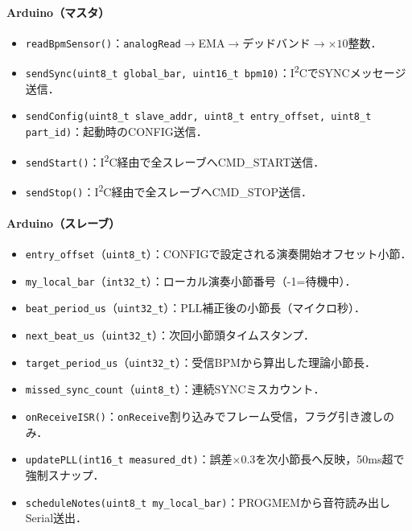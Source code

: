 \documentclass[lualatex,book,paper=a4paper,jafontsize=11.5pt,jafontscale=1.05]{jlreq}
\begin{document}
\paragraph{Arduino（マスタ）}
\begin{itemize}[leftmargin=1.2em]
  \item \texttt{readBpmSensor()}：\texttt{analogRead}$\to$EMA$\to$デッドバンド$\to \times 10$整数．
  \item \texttt{sendSync(uint8\_t global\_bar, uint16\_t bpm10)}：I\textsuperscript{2}CでSYNCメッセージ送信．
  \item \texttt{sendConfig(uint8\_t slave\_addr, uint8\_t entry\_offset, uint8\_t part\_id)}：起動時のCONFIG送信．
  \item \texttt{sendStart()}：I\textsuperscript{2}C経由で全スレーブへCMD\_START送信．
  \item \texttt{sendStop()}：I\textsuperscript{2}C経由で全スレーブへCMD\_STOP送信．
\end{itemize}

\paragraph{Arduino（スレーブ）}
\begin{itemize}[leftmargin=1.2em]
  \item \texttt{entry\_offset}（\texttt{uint8\_t}）：CONFIGで設定される演奏開始オフセット小節．
  \item \texttt{my\_local\_bar}（\texttt{int32\_t}）：ローカル演奏小節番号（-1=待機中）．
  \item \texttt{beat\_period\_us}（\texttt{uint32\_t}）：PLL補正後の小節長（マイクロ秒）．
  \item \texttt{next\_beat\_us}（\texttt{uint32\_t}）：次回小節頭タイムスタンプ．
  \item \texttt{target\_period\_us}（\texttt{uint32\_t}）：受信BPMから算出した理論小節長．
  \item \texttt{missed\_sync\_count}（\texttt{uint8\_t}）：連続SYNCミスカウント．
  \item \texttt{onReceiveISR()}：\texttt{onReceive}割り込みでフレーム受信，フラグ引き渡しのみ．
  \item \texttt{updatePLL(int16\_t measured\_dt)}：誤差$\times 0.3$を次小節長へ反映，50ms超で強制スナップ．
  \item \texttt{scheduleNotes(uint8\_t my\_local\_bar)}：PROGMEMから音符読み出しSerial送出．
\end{itemize}
\end{document}
